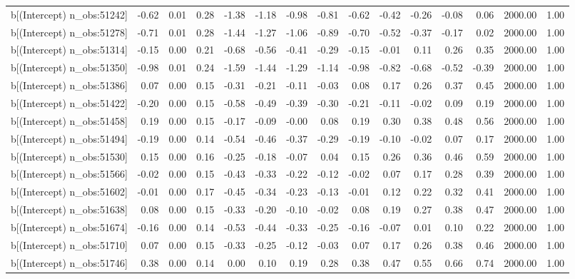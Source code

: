 \begin{table}[ht]
\begin{tabular}{rrrrrrrrrrrrrrr}
  b[(Intercept) n\_obs:51242] & -0.62 & 0.01 & 0.28 & -1.38 & -1.18 & -0.98 & -0.81 & -0.62 & -0.42 & -0.26 & -0.08 & 0.06 & 2000.00 & 1.00 \\ 
  b[(Intercept) n\_obs:51278] & -0.71 & 0.01 & 0.28 & -1.44 & -1.27 & -1.06 & -0.89 & -0.70 & -0.52 & -0.37 & -0.17 & 0.02 & 2000.00 & 1.00 \\ 
  b[(Intercept) n\_obs:51314] & -0.15 & 0.00 & 0.21 & -0.68 & -0.56 & -0.41 & -0.29 & -0.15 & -0.01 & 0.11 & 0.26 & 0.35 & 2000.00 & 1.00 \\ 
  b[(Intercept) n\_obs:51350] & -0.98 & 0.01 & 0.24 & -1.59 & -1.44 & -1.29 & -1.14 & -0.98 & -0.82 & -0.68 & -0.52 & -0.39 & 2000.00 & 1.00 \\ 
  b[(Intercept) n\_obs:51386] & 0.07 & 0.00 & 0.15 & -0.31 & -0.21 & -0.11 & -0.03 & 0.08 & 0.17 & 0.26 & 0.37 & 0.45 & 2000.00 & 1.00 \\ 
  b[(Intercept) n\_obs:51422] & -0.20 & 0.00 & 0.15 & -0.58 & -0.49 & -0.39 & -0.30 & -0.21 & -0.11 & -0.02 & 0.09 & 0.19 & 2000.00 & 1.00 \\ 
  b[(Intercept) n\_obs:51458] & 0.19 & 0.00 & 0.15 & -0.17 & -0.09 & -0.00 & 0.08 & 0.19 & 0.30 & 0.38 & 0.48 & 0.56 & 2000.00 & 1.00 \\ 
  b[(Intercept) n\_obs:51494] & -0.19 & 0.00 & 0.14 & -0.54 & -0.46 & -0.37 & -0.29 & -0.19 & -0.10 & -0.02 & 0.07 & 0.17 & 2000.00 & 1.00 \\ 
  b[(Intercept) n\_obs:51530] & 0.15 & 0.00 & 0.16 & -0.25 & -0.18 & -0.07 & 0.04 & 0.15 & 0.26 & 0.36 & 0.46 & 0.59 & 2000.00 & 1.00 \\ 
  b[(Intercept) n\_obs:51566] & -0.02 & 0.00 & 0.15 & -0.43 & -0.33 & -0.22 & -0.12 & -0.02 & 0.07 & 0.17 & 0.28 & 0.39 & 2000.00 & 1.00 \\ 
  b[(Intercept) n\_obs:51602] & -0.01 & 0.00 & 0.17 & -0.45 & -0.34 & -0.23 & -0.13 & -0.01 & 0.12 & 0.22 & 0.32 & 0.41 & 2000.00 & 1.00 \\ 
  b[(Intercept) n\_obs:51638] & 0.08 & 0.00 & 0.15 & -0.33 & -0.20 & -0.10 & -0.02 & 0.08 & 0.19 & 0.27 & 0.38 & 0.47 & 2000.00 & 1.00 \\ 
  b[(Intercept) n\_obs:51674] & -0.16 & 0.00 & 0.14 & -0.53 & -0.44 & -0.33 & -0.25 & -0.16 & -0.07 & 0.01 & 0.10 & 0.22 & 2000.00 & 1.00 \\ 
  b[(Intercept) n\_obs:51710] & 0.07 & 0.00 & 0.15 & -0.33 & -0.25 & -0.12 & -0.03 & 0.07 & 0.17 & 0.26 & 0.38 & 0.46 & 2000.00 & 1.00 \\ 
  b[(Intercept) n\_obs:51746] & 0.38 & 0.00 & 0.14 & 0.00 & 0.10 & 0.19 & 0.28 & 0.38 & 0.47 & 0.55 & 0.66 & 0.74 & 2000.00 & 1.00 \\ 

\end{tabular}
\end{table}
